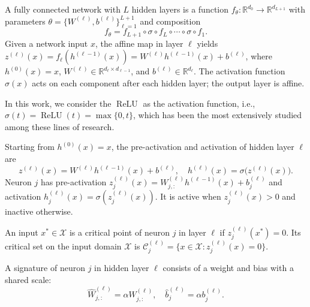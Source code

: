 \documentclass[runningheads]{llncs}
\newcommand{\relu}{\operatorname{ReLU}}
\begin{document}
\begin{definition}
\label{def:network}
A fully connected network with $L$ hidden layers is a function $f_\theta:\mathbb R^{d_0}\to\mathbb R^{d_{L+1}}$ with parameters $\theta=\{W^{(\ell)},b^{(\ell)}\}_{\ell=1}^{L+1}$ and composition
\begin{equation*}
f_\theta=f_{L+1}\circ\sigma\circ f_L\circ\cdots\circ\sigma\circ f_1.
\end{equation*}
Given a network input $x$, the affine map in layer $\ell$ yields $z^{(\ell)}(x)=f_\ell(h^{(\ell-1)}(x))=W^{(\ell)}h^{(\ell-1)}(x)+b^{(\ell)}$, where $h^{(0)}(x)=x$, $W^{(\ell)}\in\mathbb R^{d_\ell\times d_{\ell-1}}$, and $b^{(\ell)}\in\mathbb R^{d_\ell}$.
The activation function $\sigma(x)$ acts on each component after each hidden layer; the output layer is affine.
\end{definition}
In this work, we consider the $\relu$ as the activation function, i.e., $\sigma(t)=\relu(t)=\max\{0,t\}$, which has been the most extensively studied among these lines of research.

\begin{definition}
\label{def:neuron}
Starting from $h^{(0)}(x)=x$, the pre-activation and activation of hidden layer $\ell$ are
\begin{equation*}
z^{(\ell)}(x)=W^{(\ell)}h^{(\ell-1)}(x)+b^{(\ell)},
\quad h^{(\ell)}(x)=\sigma\bigl(z^{(\ell)}(x)\bigr).
\end{equation*}
Neuron $j$ has pre-activation $z_j^{(\ell)}(x)=W_{j,:}^{(\ell)}h^{(\ell-1)}(x)+b_j^{(\ell)}$ and activation $h_j^{(\ell)}(x)=\sigma(z_j^{(\ell)}(x))$.
It is active when $z_j^{(\ell)}(x)>0$ and inactive otherwise.
\end{definition}

\begin{definition}
\label{def:critical}
An input $x^*\in\mathcal X$ is a critical point of neuron $j$ in layer $\ell$ if $z_j^{(\ell)}(x^*)=0$.
Its critical set on the input domain $\mathcal{X}$ is $\mathcal C_j^{(\ell)}=\{x\in\mathcal X:z_j^{(\ell)}(x)=0\}$.
\end{definition}

\begin{definition}[Signature]
\label{def:signature}
A signature of neuron $j$ in hidden layer $\ell$ consists of a weight and bias with a shared scale:
\begin{equation*}
\widehat W_{j,:}^{(\ell)}=\alpha W_{j,:}^{(\ell)},\quad\widehat b_j^{(\ell)}=\alpha b_j^{(\ell)}.
\end{equation*}
\end{definition}
\end{document}
